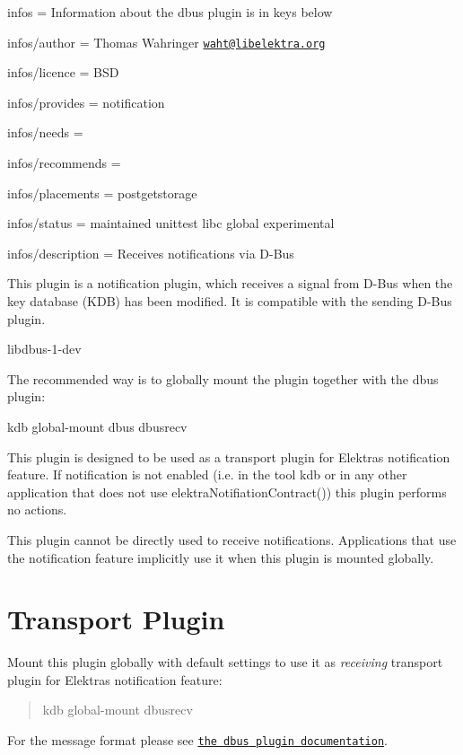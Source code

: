 
\begin{DoxyItemize}
\item infos = Information about the dbus plugin is in keys below
\item infos/author = Thomas Wahringer \href{mailto:waht@libelektra.org}{\tt waht@libelektra.\+org}
\item infos/licence = B\+SD
\item infos/provides = notification
\item infos/needs =
\item infos/recommends =
\item infos/placements = postgetstorage
\item infos/status = maintained unittest libc global experimental
\item infos/description = Receives notifications via D-\/\+Bus
\end{DoxyItemize}

This plugin is a notification plugin, which receives a signal from D-\/\+Bus when the key database (K\+DB) has been modified. It is compatible with the sending D-\/\+Bus plugin.


\begin{DoxyItemize}
\item {\ttfamily libdbus-\/1-\/dev}
\end{DoxyItemize}

The recommended way is to globally mount the plugin together with the dbus plugin\+:


\begin{DoxyCode}
kdb global-mount dbus dbusrecv
\end{DoxyCode}


This plugin is designed to be used as a transport plugin for Elektra\textquotesingle{}s notification feature. If notification is not enabled (i.\+e. in the tool {\ttfamily kdb} or in any other application that does not use {\ttfamily elektra\+Notifiation\+Contract()}) this plugin performs no actions.

This plugin cannot be directly used to receive notifications. Applications that use the notification feature implicitly use it when this plugin is mounted globally.\hypertarget{autotoc_md166_autotoc_md169}{}\section{Transport Plugin}\label{autotoc_md166_autotoc_md169}
Mount this plugin globally with default settings to use it as {\itshape receiving} transport plugin for Elektra\textquotesingle{}s notification feature\+:

\begin{quote}
kdb global-\/mount dbusrecv \end{quote}


For the message format please see \href{https://www.libelektra.org/plugins/dbus#notification-format}{\tt the {\ttfamily dbus} plugin documentation}. 